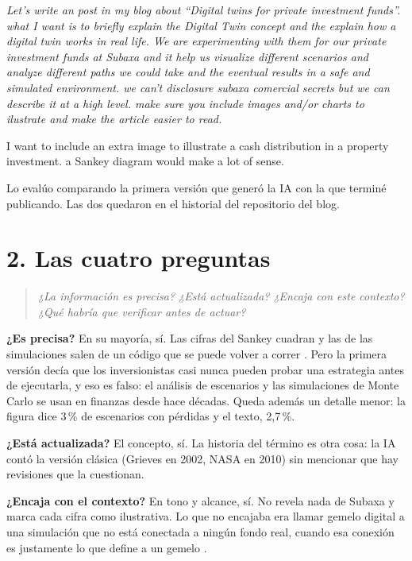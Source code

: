 \documentclass[11pt,letterpaper]{article}
\newcommand{\pregunta}[1]{%
  \begin{quote}\color{cGris}\small\itshape #1\end{quote}}
\newenvironment{prompt}{%
  \begin{center}\begin{minipage}{0.92\textwidth}\color{black!80}\small
  \setlength{\parskip}{0.4em}}{%
  \end{minipage}\end{center}}
\begin{document}
\begin{prompt}
\itshape
Let's write an post in my blog about \enquote{Digital twins for private
investment funds}.
what I want is to briefly explain the Digital Twin concept
and the explain how a digital twin works in real life. We are experimenting
with them for our private investment funds at Subaxa and it help us
visualize different scenarios and analyze different paths we could take and
the eventual results in a safe and simulated environment. we can't disclosure
subaxa comercial secrets but we can describe it at a high level. make sure
you include images and/or charts to ilustrate and make the article easier
to read.

I want to include an extra image to illustrate a cash distribution in a
property investment. a Sankey diagram would make a lot of sense.
\end{prompt}

Lo evalúo comparando la primera versión que generó la IA con la que terminé
publicando. Las dos quedaron en el historial del repositorio del blog.

\section*{2. Las cuatro preguntas}

\pregunta{¿La información es precisa? ¿Está actualizada? ¿Encaja con este
contexto? ¿Qué habría que verificar antes de actuar?}

\textbf{¿Es precisa?} En su mayoría, sí. Las cifras del Sankey cuadran y las
de las simulaciones salen de un código que se puede volver a correr
\parencite{rojas2026codigo}. Pero la primera versión decía que los
inversionistas casi nunca pueden probar una estrategia antes de ejecutarla,
y eso es falso: el análisis de escenarios y las simulaciones de Monte Carlo
se usan en finanzas desde hace décadas. Queda además un detalle menor: la
figura dice 3\,\% de escenarios con pérdidas y el texto, 2,7\,\%.

\textbf{¿Está actualizada?} El concepto, sí. La historia del término es otra
cosa: la IA contó la versión clásica (Grieves en 2002, NASA en 2010) sin
mencionar que hay revisiones que la cuestionan.

\textbf{¿Encaja con el contexto?} En tono y alcance, sí. No revela nada de
Subaxa y marca cada cifra como ilustrativa. Lo que no encajaba era llamar
gemelo digital a una simulación que no está conectada a ningún fondo real,
cuando esa conexión es justamente lo que define a un gemelo
\parencite{nasem2023}.
\end{document}
